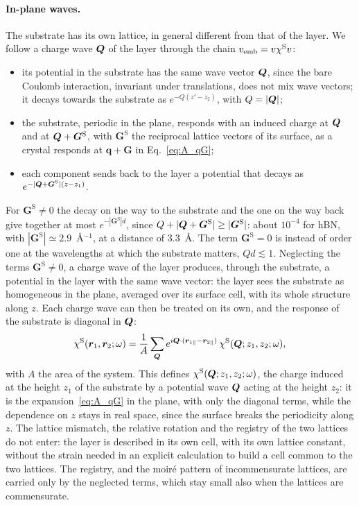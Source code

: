 \documentclass[10pt,a4paper]{paper}
\begin{document}
\paragraph{In-plane waves.} The substrate has its own lattice, in general different from that of the layer. We follow
a charge wave $\bm{Q}$ of the layer through the chain $v_{\mathrm{emb}} = v\chi^{\mathrm{S}} v$:
\begin{itemize}
\item its potential in the substrate has the same wave vector $\bm{Q}$, since the bare Coulomb interaction, invariant
  under translations, does not mix wave vectors; it decays towards the substrate as $e^{-Q(z' - z_2)}$, with
  $Q = |\bm{Q}|$;
\item the substrate, periodic in the plane, responds with an induced charge at $\bm{Q}$ and at
  $\bm{Q} + \bm{G}^{\mathrm{S}}$, with $\bm{G}^{\mathrm{S}}$ the reciprocal lattice vectors of its surface, as a crystal
  responds at $\bm{q} + \bm{G}$ in Eq.~\eqref{eq:A_qG};
\item each component sends back to the layer a potential that decays as
  $e^{-|\bm{Q} + \bm{G}^{\mathrm{S}}|(z - z_1)}$.
\end{itemize}
For $\bm{G}^{\mathrm{S}} \neq 0$ the decay on the way to the substrate and the one on the way back give together at
most $e^{-|\bm{G}^{\mathrm{S}}|d}$, since $Q + |\bm{Q} + \bm{G}^{\mathrm{S}}| \ge |\bm{G}^{\mathrm{S}}|$: about
$10^{-4}$ for hBN, with $|\bm{G}^{\mathrm{S}}| \simeq 2.9$~\AA$^{-1}$, at a distance of 3.3~\AA. The term
$\bm{G}^{\mathrm{S}} = 0$ is instead of order one at the wavelengths at which the substrate matters, $Qd \lesssim 1$.
Neglecting the terms $\bm{G}^{\mathrm{S}} \neq 0$, a charge wave of the layer produces, through the substrate, a
potential in the layer with the same wave vector: the layer sees the substrate as homogeneous in the plane, averaged
over its surface cell, with its whole structure along $z$. Each charge wave can then be treated on its own, and the
response of the substrate is diagonal in $\bm{Q}$:
\begin{equation}
\chi^{\mathrm{S}}(\bm{r}_1,\bm{r}_2;\omega) = \frac{1}{A}\sum_{\bm{Q}} e^{i\bm{Q}\cdot(\bm{r}_{1\parallel} - \bm{r}_{2\parallel})}\,
\chi^{\mathrm{S}}(\bm{Q};z_1,z_2;\omega) ,
\label{eq:chiS_Q}
\end{equation}
with $A$ the area of the system. This defines $\chi^{\mathrm{S}}(\bm{Q};z_1,z_2;\omega)$, the charge induced at the height $z_1$ of
the substrate by a potential wave $\bm{Q}$ acting at the height $z_2$: it is the expansion~\eqref{eq:A_qG} in the plane,
with only the diagonal terms, while the dependence on $z$ stays in real space, since the surface breaks the periodicity
along $z$. The lattice mismatch, the relative rotation and the registry of the two lattices do not enter: the layer is
described in its own cell, with its own lattice constant, without the strain needed in an explicit calculation to
build a cell common to the two lattices. The registry, and the moir\'e pattern of incommensurate lattices, are carried
only by the neglected terms, which stay small also when the lattices are commensurate.
\end{document}
